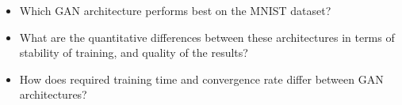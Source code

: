 \documentclass[12pt,
 reprint,
 amsmath,amssymb,
 aps,
]{revtex4-2}
\begin{document}
\begin{itemize}
    \item Which GAN architecture performs best on the MNIST dataset?
    \item What are the quantitative differences between these architectures in terms of stability of training, and quality of the results? 
    \item How does required training time and convergence rate differ between GAN architectures?
\end{itemize}



\end{document}
